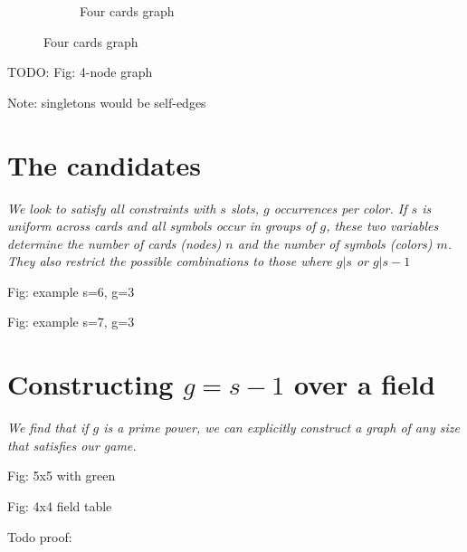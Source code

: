 \documentclass[11pt, oneside]{article} 	%
\begin{document}
\begin{figure}[!htb]
\begin{subfigure}{.2\textwidth}
\centering
{}
\caption{Four cards graph}
\label{fig:cards-links}
\end{subfigure}
\end{figure}

TODO: Fig: 4-node graph

Note: singletons would be self-edges



\section{The candidates}

\emph{We look to satisfy all constraints with $s$ slots, $g$ occurrences per color.  If $s$ is uniform across cards and all symbols occur in groups of $g$, these two variables determine the number of cards (nodes) $n$ and the number of symbols (colors) $m$.  They also restrict the possible combinations to those where $g | s$ or $g | s-1$}



Fig: example s=6, g=3

Fig: example s=7, g=3





\section{Constructing $g = s-1$ over a field}

\emph{We find that if $g$ is a prime power, we can explicitly construct a graph of any size that satisfies our game.}



Fig: 5x5 with green

Fig: 4x4 field table



Todo proof: 
\end{document}
